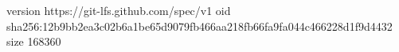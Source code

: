 version https://git-lfs.github.com/spec/v1
oid sha256:12b9bb2ea3c02b6a1be65d9079fb466aa218fb66fa9fa044c466228d1f9d4432
size 168360
